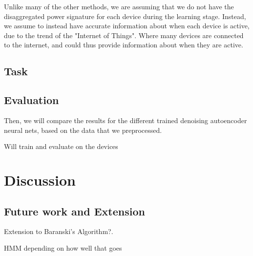 \documentclass{article}
\begin{document}
Unlike many of the other methods, we are assuming that we do not have the disaggregated power signature for each device during the learning stage.
Instead, we assume to instead have accurate information about when each device is active, due to the trend of the "Internet of Things".
Where many devices are connected to the internet, and could thus provide information about when they are active.

\subsection{Task}



\subsection{Evaluation}


Then, we will compare the results for the different trained denoising autoencoder neural nets, based on the data that we preprocessed.

Will train and evaluate on the devices %






\section{Discussion}

\subsection{Future work and Extension}

Extension to Baranski's Algorithm?.

HMM depending on how well that goes



\end{document}
